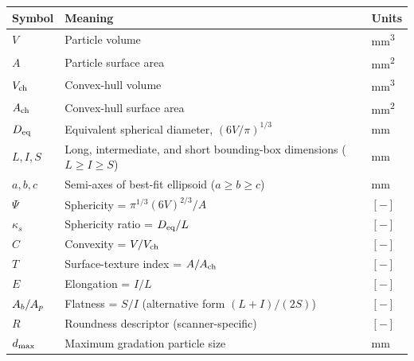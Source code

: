 {\small
\renewcommand{\arraystretch}{1.12}
\begin{tabular}{@{}p{}p{}p{}@{}}
\toprule
\rowcolor{tablehdr}
{\color{white}\textbf{Symbol}} & {\color{white}\textbf{Meaning}} & {\color{white}\textbf{Units}}\\
\midrule
$V$            & Particle volume                                     & \si{\milli\metre\cubed} \\
$A$            & Particle surface area                               & \si{\milli\metre\squared} \\
$V_{\mathrm{ch}}$         & Convex-hull volume                                  & \si{\milli\metre\cubed} \\
$A_{\mathrm{ch}}$         & Convex-hull surface area                            & \si{\milli\metre\squared} \\
$D_{\mathrm{eq}}$         & Equivalent spherical diameter,
                 $\left(6V/\pi\right)^{1/3}$                          & \si{\milli\metre} \\
$L, I, S$      & Long, intermediate, and short bounding-box dimensions
                 ($L\ge I\ge S$)                                      & \si{\milli\metre} \\
$a,b,c$        & Semi-axes of best-fit ellipsoid ($a\ge b\ge c$)     & \si{\milli\metre} \\
$\Psi$         & Sphericity = $\pi^{1/3}(6V)^{2/3}/A$
                 \citep{Wadell1932}                                   & $[-]$ \\
$\kappa_{s}$   & Sphericity ratio = $D_{\mathrm{eq}}/L$                          & $[-]$ \\
$C$            & Convexity = $V/V_{\mathrm{ch}}$                                 & $[-]$ \\
$T$            & Surface-texture index = $A/A_{\mathrm{ch}}$                    & $[-]$ \\
$E$            & Elongation = $I/L$                                  & $[-]$ \\
$A_{b}/A_{p}$      & Flatness = $S/I$ (alternative form $(L+I)/(2S)$)    & $[-]$ \\
$R$            & Roundness descriptor (scanner-specific)             & $[-]$ \\
$d_{\max}$        & Maximum gradation particle size                      & \si{\milli\metre} \\
\bottomrule
\end{tabular}}

\vspace{0.7em}

